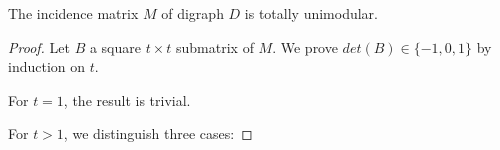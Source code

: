 \begin{lec}[2012-01-19]\end{lec}

\begin{thm}
The incidence matrix $M$ of digraph $D$ is totally unimodular.
\end{thm}
\begin{proof}
Let $B$ a square $t \times t$ submatrix of $M$. We prove $det(B) \in
\{-1,0,1\}$ by induction on $t$.

For $t = 1$, the result is trivial.

For $t > 1$, we distinguish three cases:
\end{proof}